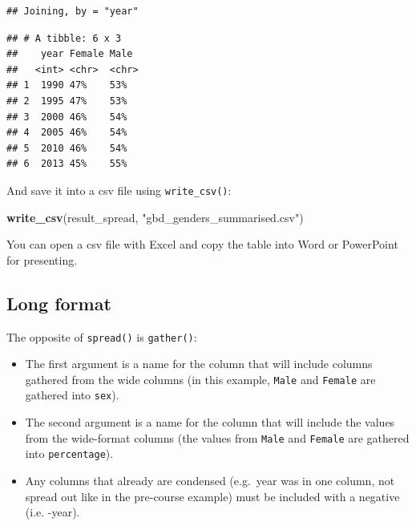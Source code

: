 \documentclass[12pt,]{krantz}
\makeatletter
\newenvironment{Shaded}{\begin{snugshade}}{\end{snugshade}}
\newcommand{\DataTypeTok}[1]{\textcolor[rgb]{0.13,0.29,0.53}{#1}}
\newcommand{\DecValTok}[1]{\textcolor[rgb]{0.00,0.00,0.81}{#1}}
\newcommand{\KeywordTok}[1]{\textcolor[rgb]{0.13,0.29,0.53}{\textbf{#1}}}
\newcommand{\NormalTok}[1]{#1}
\newcommand{\OperatorTok}[1]{\textcolor[rgb]{0.81,0.36,0.00}{\textbf{#1}}}
\newcommand{\StringTok}[1]{\textcolor[rgb]{0.31,0.60,0.02}{#1}}
\providecommand{\tightlist}{%
  \setlength{\itemsep}{0pt}\setlength{\parskip}{0pt}}
\newenvironment{kframe}{%
\medskip{}
\setlength{\fboxsep}{.8em}
 \def\at@end@of@kframe{}%
 \ifinner\ifhmode%
  \def\at@end@of@kframe{\end{minipage}}%
  \begin{minipage}{\columnwidth}%
 \fi\fi%
 \def\FrameCommand##1{\hskip\@totalleftmargin \hskip-\fboxsep
 \colorbox{shadecolor}{##1}\hskip-\fboxsep
     \hskip-\linewidth \hskip-\@totalleftmargin \hskip\columnwidth}%
 \MakeFramed {\advance\hsize-\width
   \@totalleftmargin\z@ \linewidth\hsize
   \@setminipage}}%
 {\par\unskip\endMakeFramed%
 \at@end@of@kframe}
\renewenvironment{Shaded}{\begin{kframe}}{\end{kframe}}
\theoremstyle{definition}
\theoremstyle{definition}
\theoremstyle{definition}
\theoremstyle{remark}
\makeatother
\begin{document}
\begin{verbatim}
## Joining, by = "year"
\end{verbatim}

\begin{Shaded}
\end{Shaded}

\begin{verbatim}
## # A tibble: 6 x 3
##    year Female Male 
##   <int> <chr>  <chr>
## 1  1990 47%    53%  
## 2  1995 47%    53%  
## 3  2000 46%    54%  
## 4  2005 46%    54%  
## 5  2010 46%    54%  
## 6  2013 45%    55%
\end{verbatim}

And save it into a csv file using \texttt{write\_csv()}:

\begin{Shaded}
\begin{Highlighting}[]
\KeywordTok{write_csv}\NormalTok{(result_spread, }\StringTok{"gbd_genders_summarised.csv"}\NormalTok{)}
\end{Highlighting}
\end{Shaded}

You can open a csv file with Excel and copy the table into Word or
PowerPoint for presenting.

\hypertarget{long-format}{%
\subsection{Long format}\label{long-format}}

The opposite of \texttt{spread()} is \texttt{gather()}:

\begin{itemize}
\tightlist
\item
  The first argument is a name for the column that will include columns
  gathered from the wide columns (in this example, \texttt{Male} and
  \texttt{Female} are gathered into \texttt{sex}).
\item
  The second argument is a name for the column that will include the
  values from the wide-format columns (the values from \texttt{Male} and
  \texttt{Female} are gathered into \texttt{percentage}).
\item
  Any columns that already are condensed (e.g.~year was in one column,
  not spread out like in the pre-course example) must be included with a
  negative (i.e. -year).
\end{itemize}
\end{document}
